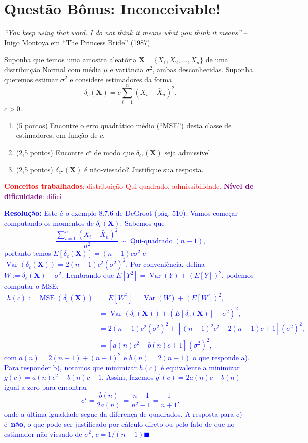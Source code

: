 \documentclass[a4paper,10pt, notitlepage]{report}
\newcommand{\vr}{\operatorname{Var}} %
\newcommand{\rs}{X_1, X_2, \ldots, X_n} %
\newcommand{\bX}{\boldsymbol{X}} %
\begin{document}
\section*{Questão Bônus: Inconceivable!} 

\textit{``You keep using that word. I do not think it means what you think it means''} -- Inigo Montoya em ``The Princess Bride'' (1987).

Suponha que temos uma amostra aleatória $\bX = \{ \rs \}$ de uma distribuição Normal com média $\mu$ e variância $\sigma^2$, ambas desconhecidas.
Suponha queremos estimar $\sigma^2$ e considere estimadores da forma
\begin{equation}
 \delta_c(\bX) = c\sum_{i=1}^n \left(X_i - \bar{X}_n\right)^2,
\end{equation}
$c>0$.

\begin{enumerate}[label=\alph*)]
 \item (5 pontos) Encontre o erro quadrático médio (``MSE'') desta classe de estimadores, em função de $c$. 
 \item (2,5 pontos) Encontre $c^\star$ de modo que $\delta_{c^\star}(\bX)$ seja admissível.
 \item (2,5 pontos) $\delta_{c^\star}(\bX)$ é não-viesado? Justifique sua resposta.
\end{enumerate}

\textcolor{red}{\textbf{Conceitos trabalhados}: distribuição Qui-quadrado, admissibilidade.} \textcolor{purple}{\textbf{Nível de dificuldade}: difícil.}

\textcolor{blue}{
\textbf{Resolução:}
Este é o exemplo 8.7.6 de DeGroot (pág. 510).
Vamos começar computando os momentos de $\delta_c(\bX)$.
Sabemos que 
\[ \frac{\sum_{i=1}^n\left(X_i - \bar{X}_n\right)^2}{\sigma^2} \sim \operatorname{Qui-quadrado}(n-1), \]
portanto temos $E[\delta_c(\bX)]= (n-1)c\sigma^2$ e $\vr(\delta_c(\bX)) = 2(n-1)c^2(\sigma^2)^2$.
Por conveniência, defina $W := \delta_c(\bX) - \sigma^2$.
Lembrando que $E[Y^2] = \vr(Y) + (E[Y])^2$, podemos computar o MSE:
\begin{align*}
h(c) := \operatorname{MSE}(\delta_c(\bX)) &= E[W^2] = \vr(W) + \left(E[W]\right)^2,\\
&= \vr(\delta_c(\bX)) + \left(E[\delta_c(\bX)] - \sigma^2\right)^2,\\
&= 2(n-1)c^2(\sigma^2)^2 + \left[(n-1)^2c^2 - 2(n-1)c + 1\right](\sigma^2)^2 ,\\
&= \left[a(n)c^2 - b(n)c + 1\right](\sigma^2)^2,
\end{align*}
com $a(n) = 2(n-1) + (n-1)^2$ e $b(n) = 2(n-1)$ o que responde a).
Para responder b), notamos que minimizar $h(c)$ é equivalente a minimizar $g(c) = a(n)c^2 - b(n)c + 1$.
Assim, fazemos $g^\prime(c) = 2a(n)c - b(n)$ igual a zero para encontrar
\begin{equation*}
 c^\star = \frac{b(n)}{2a(n)} = \frac{n-1}{n^2-1} = \frac{1}{n+1}, 
\end{equation*}
onde a última igualdade segue da diferença de quadrados.
A resposta para c) é~\textbf{não}, o que pode ser justificado por cálculo direto ou pelo fato de que no estimador não-viesado de $\sigma^2$, $ c = 1/(n-1)$$\blacksquare$
}




\end{document}
